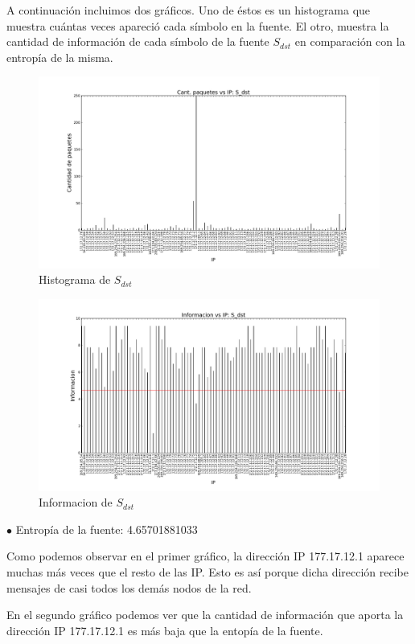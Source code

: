 A continuación incluimos dos gráficos. Uno de éstos es un histograma que muestra cuántas veces apareció cada símbolo en la fuente. El otro, muestra la cantidad de información de cada símbolo de la fuente $S_{dst}$ en comparación con la entropía de la misma. 

\begin{figure}[H]\centering
    \includegraphics[width=0.8\linewidth]{../imgs/red-alto-palermo_S_dst_hist.png}
    \caption{Histograma de $S_{dst}$}\label{fig:Alto-dst-hist}
\end{figure}

\begin{figure}[H]\centering
    \includegraphics[width=0.8\linewidth]{../imgs/red-alto-palermo_S_dst_info.png}
    \caption{Informacion de $S_{dst}$}\label{fig:Alto-dst-info}
\end{figure}

$\bullet$ Entropía de la fuente: 4.65701881033

Como podemos observar en el primer gráfico, la dirección IP 177.17.12.1 aparece muchas más veces que el resto de las IP. Esto es así porque dicha dirección recibe mensajes de casi todos los demás nodos de la red.

En el segundo gráfico podemos ver que la cantidad de información que aporta la dirección IP 177.17.12.1 es más baja que la entopía de la fuente.
 
